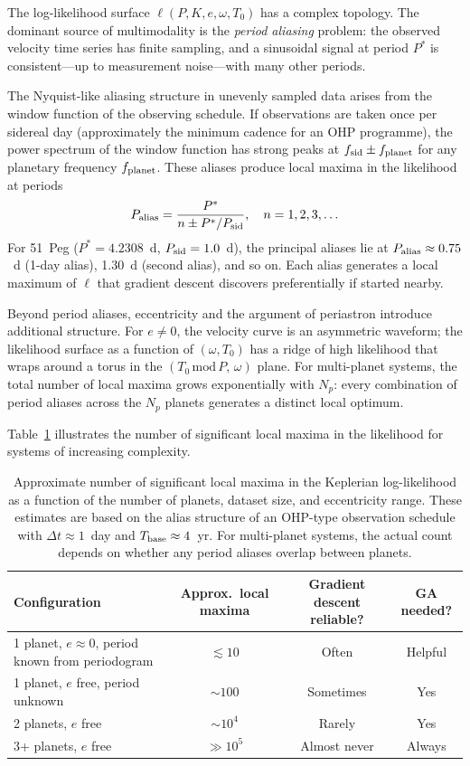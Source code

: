 \documentclass[12pt]{article}
\begin{document}
The log-likelihood surface $\ell(P, K, e, \omega, T_0)$ has a complex
topology.  The dominant source of multimodality is the \emph{period
aliasing} problem: the observed velocity time series has finite sampling,
and a sinusoidal signal at period $P^*$ is consistent---up to measurement
noise---with many other periods.

The Nyquist-like aliasing structure in unevenly sampled data arises
from the window function of the observing schedule.  If observations
are taken once per sidereal day (approximately the minimum cadence for
an OHP programme), the power spectrum of the window function has
strong peaks at $f_{\rm sid} \pm f_{\rm planet}$ for any planetary
frequency $f_{\rm planet}$.  These aliases produce local maxima in
the likelihood at periods
\begin{equation}\label{eq:aliases}
  P_{\rm alias} = \frac{P^*}{n \pm P^*/P_{\rm sid}},
  \quad n = 1, 2, 3, \ldots
\end{equation}
For 51~Peg ($P^* = 4.2308$~d, $P_{\rm sid} = 1.0$~d), the principal
aliases lie at $P_{\rm alias} \approx 0.75$~d (1-day alias), 1.30~d
(second alias), and so on.  Each alias generates a local maximum of
$\ell$ that gradient descent discovers preferentially if started nearby.

Beyond period aliases, eccentricity and the argument of periastron
introduce additional structure.  For $e \neq 0$, the velocity curve
is an asymmetric waveform; the likelihood surface as a function of
$(\omega, T_0)$ has a ridge of high likelihood that wraps around a
torus in the $(T_0\,\text{mod}\,P,\,\omega)$ plane.  For multi-planet
systems, the total number of local maxima grows exponentially with
$N_p$: every combination of period aliases across the $N_p$ planets
generates a distinct local optimum.

Table~\ref{tab:multimodal} illustrates the number of significant local
maxima in the likelihood for systems of increasing complexity.

\begin{table}[ht]
\centering
\caption{Approximate number of significant local maxima in the
Keplerian log-likelihood as a function of the number of planets,
dataset size, and eccentricity range.  These estimates are based
on the alias structure of an OHP-type observation schedule with
$\Delta t \approx 1$~day and $T_{\rm base} \approx 4$~yr.
For multi-planet systems, the actual count depends on whether
any period aliases overlap between planets.}
\label{tab:multimodal}
\medskip
\begin{tabular}{lccc}
\toprule
Configuration & Approx.\ local maxima & Gradient descent
  reliable? & GA needed? \\
\midrule
1 planet, $e \approx 0$, period known from periodogram
  & $\lesssim 10$  & Often & Helpful \\
1 planet, $e$ free, period unknown
  & $\sim 100$     & Sometimes & Yes \\
2 planets, $e$ free
  & $\sim 10^4$    & Rarely & Yes \\
3+ planets, $e$ free
  & $\gg 10^5$     & Almost never & Always \\
\bottomrule
\end{tabular}
\end{table}
\end{document}
